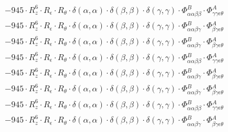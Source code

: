 \documentclass{article}
\begin{document}
\begin{subequations}
\begin{gather}
\begin{array}{c}
 \\[0.2em] 		 - 945 \cdot R_{z}^{6} \cdot R_{\epsilon{}} \cdot R_{\theta{}} \cdot \delta{}\left(\alpha{}, \alpha{}\right) \cdot \delta{}\left(\beta{}, \beta{}\right) \cdot \delta{}\left(\gamma{}, \gamma{}\right) \cdot \Phi{}^{B}_{\alpha{}\alpha{}\beta{}\beta{}} \cdot \Phi{}^{A}_{\gamma{}\gamma{}\epsilon{}\theta{}} 
 \\[0.2em] 		 - 945 \cdot R_{z}^{6} \cdot R_{\epsilon{}} \cdot R_{\theta{}} \cdot \delta{}\left(\alpha{}, \alpha{}\right) \cdot \delta{}\left(\beta{}, \beta{}\right) \cdot \delta{}\left(\gamma{}, \gamma{}\right) \cdot \Phi{}^{B}_{\alpha{}\alpha{}\beta{}\gamma{}} \cdot \Phi{}^{A}_{\beta{}\gamma{}\epsilon{}\theta{}} 
 \\[0.2em] 		 - 945 \cdot R_{z}^{6} \cdot R_{\epsilon{}} \cdot R_{\theta{}} \cdot \delta{}\left(\alpha{}, \alpha{}\right) \cdot \delta{}\left(\beta{}, \beta{}\right) \cdot \delta{}\left(\gamma{}, \gamma{}\right) \cdot \Phi{}^{B}_{\alpha{}\alpha{}\beta{}\gamma{}} \cdot \Phi{}^{A}_{\beta{}\gamma{}\epsilon{}\theta{}} 
 \\[0.2em] 		 - 945 \cdot R_{z}^{6} \cdot R_{\epsilon{}} \cdot R_{\theta{}} \cdot \delta{}\left(\alpha{}, \alpha{}\right) \cdot \delta{}\left(\beta{}, \beta{}\right) \cdot \delta{}\left(\gamma{}, \gamma{}\right) \cdot \Phi{}^{B}_{\alpha{}\alpha{}\beta{}\beta{}} \cdot \Phi{}^{A}_{\gamma{}\gamma{}\epsilon{}\theta{}} 
 \\[0.2em] 		 - 945 \cdot R_{z}^{6} \cdot R_{\epsilon{}} \cdot R_{\theta{}} \cdot \delta{}\left(\alpha{}, \alpha{}\right) \cdot \delta{}\left(\beta{}, \beta{}\right) \cdot \delta{}\left(\gamma{}, \gamma{}\right) \cdot \Phi{}^{B}_{\alpha{}\alpha{}\beta{}\gamma{}} \cdot \Phi{}^{A}_{\beta{}\gamma{}\epsilon{}\theta{}} 
 \\[0.2em] 		 - 945 \cdot R_{z}^{6} \cdot R_{\epsilon{}} \cdot R_{\theta{}} \cdot \delta{}\left(\alpha{}, \alpha{}\right) \cdot \delta{}\left(\beta{}, \beta{}\right) \cdot \delta{}\left(\gamma{}, \gamma{}\right) \cdot \Phi{}^{B}_{\alpha{}\alpha{}\beta{}\gamma{}} \cdot \Phi{}^{A}_{\beta{}\gamma{}\epsilon{}\theta{}} 
 \\[0.2em] 		 - 945 \cdot R_{z}^{6} \cdot R_{\epsilon{}} \cdot R_{\theta{}} \cdot \delta{}\left(\alpha{}, \alpha{}\right) \cdot \delta{}\left(\beta{}, \beta{}\right) \cdot \delta{}\left(\gamma{}, \gamma{}\right) \cdot \Phi{}^{B}_{\alpha{}\alpha{}\beta{}\beta{}} \cdot \Phi{}^{A}_{\gamma{}\gamma{}\epsilon{}\theta{}} 
 \\[0.2em] 		 - 945 \cdot R_{z}^{6} \cdot R_{\epsilon{}} \cdot R_{\theta{}} \cdot \delta{}\left(\alpha{}, \alpha{}\right) \cdot \delta{}\left(\beta{}, \beta{}\right) \cdot \delta{}\left(\gamma{}, \gamma{}\right) \cdot \Phi{}^{B}_{\alpha{}\alpha{}\beta{}\gamma{}} \cdot \Phi{}^{A}_{\beta{}\gamma{}\epsilon{}\theta{}} 

\end{array}
\end{gather}
\end{subequations}
\end{document}
